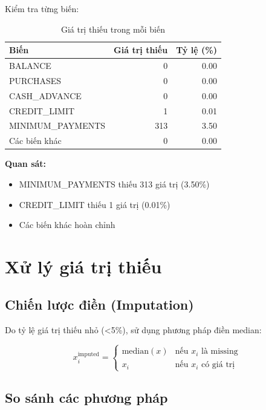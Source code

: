 Kiểm tra từng biến:

\begin{table}[H]
\centering
\caption{Giá trị thiếu trong mỗi biến}
\begin{tabular}{|l|r|r|}
\hline
\textbf{Biến} & \textbf{Giá trị thiếu} & \textbf{Tỷ lệ (\%)} \\
\hline
BALANCE & 0 & 0.00 \\
\hline
PURCHASES & 0 & 0.00 \\
\hline
CASH\_ADVANCE & 0 & 0.00 \\
\hline
CREDIT\_LIMIT & 1 & 0.01 \\
\hline
MINIMUM\_PAYMENTS & 313 & 3.50 \\
\hline
Các biến khác & 0 & 0.00 \\
\hline
\end{tabular}
\end{table}

\textbf{Quan sát:} 
\begin{itemize}
    \item MINIMUM\_PAYMENTS thiếu 313 giá trị (3.50\%)
    \item CREDIT\_LIMIT thiếu 1 giá trị (0.01\%)
    \item Các biến khác hoàn chỉnh
\end{itemize}

\section{Xử lý giá trị thiếu}

\subsection{Chiến lược điền (Imputation)}

Do tỷ lệ giá trị thiếu nhỏ (<5\%), sử dụng phương pháp điền median:

\begin{equation}
x_i^{\text{imputed}} = \begin{cases}
\text{median}(x) & \text{nếu } x_i \text{ là missing} \\
x_i & \text{nếu } x_i \text{ có giá trị}
\end{cases}
\end{equation}

\subsection{So sánh các phương pháp}

